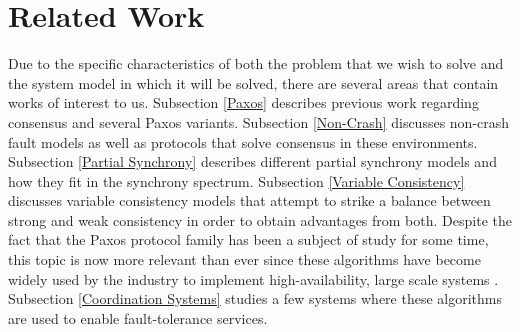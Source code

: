 \chapter{Related Work} \label{Related Work}

Due to the specific characteristics of both the problem that we wish to solve and the system model in which it will be solved, there are several areas that contain works of interest to us. Subsection \ref{Paxos} describes previous work regarding consensus and several Paxos variants. Subsection \ref{Non-Crash} discusses non-crash fault models as well as protocols that solve consensus in these environments. Subsection \ref{Partial Synchrony} describes different partial synchrony models and how they fit in the synchrony spectrum. Subsection \ref{Variable Consistency} discusses variable consistency models that attempt to strike a balance between strong and weak consistency in order to obtain advantages from both. {\color{red}Despite the fact that the Paxos protocol family has been a subject of study for some time, this topic is now more relevant than ever since these algorithms have become widely used by the industry to implement high-availability, large scale systems \cite{Burrows2006,Hunt2010}}. Subsection \ref{Coordination Systems} studies a few systems where these algorithms are used to enable fault-tolerance services.


